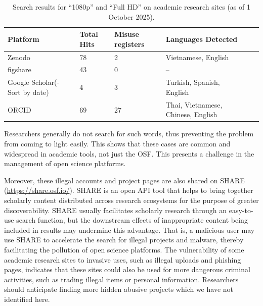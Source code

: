 \documentclass[authordate, meta]{jote-new-article}
\begin{document}
	\begin{table}
		\begin{tabular}{@{} l l l l l l @{}}

			 \textbf{Platform} & \textbf{Total Hits} & \textbf{Misuse registers} &
			\textbf{Languages Detected} \\
\hline
			   Zenodo & 78 & 2 & Vietnamese, English \\

			   figshare & 43 & 0 & – \\

			   Google Scholar(- Sort by date) & 4 & 3 & Turkish, Spanish, English \\

			 ORCID & 69 & 27 & Thai, Vietnamese, Chinese, English \\
\hline
		\end{tabular}

		\caption{Search results for “1080p” and “Full HD” on academic research sites (as of 1 October 2025).}
	\end{table}









	Researchers generally do not search for such words, thus preventing the problem from coming to light easily. This shows that these cases are common and widespread in academic tools, not just the OSF. This presents a challenge in the management of open science platforms.



	Moreover, these illegal accounts and project pages are also shared on SHARE (\url{https://share.osf.io/}). SHARE is an open API tool that helps to bring together scholarly content distributed across research ecosystems for the purpose of greater discoverability. SHARE usually facilitates scholarly research through an easy-to-use search function, but the downstream effects of inappropriate content being included in results may undermine this advantage. That is, a malicious user may use SHARE to accelerate the search for illegal projects and malware, thereby facilitating the pollution of open science platforms. The vulnerability of some academic research sites to invasive uses, such as illegal uploads and phishing pages, indicates that these sites could also be used for more dangerous criminal activities, such as trading illegal items or personal information. Researchers should anticipate finding more hidden abusive projects which we have not identified here.
\end{document}
